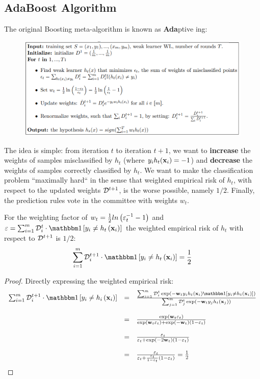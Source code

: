 \subsection{AdaBoost Algorithm}
The original Boosting meta-algorithm is known as \textbf{Ada}ptive ing:
\begin{figure}[h!]
	\centering
	\includegraphics[width=6in]{chapters/ensemble.methods/figures/adaboost_pseudo.png}
\end{figure}

The idea is simple: from iteration $t$ to iteration $t+1$, we want to \textbf{increase} the weights of samples misclassified  by $h_t$ (where $y_i h_t(\mathbf{x}_i)=-1$) and \textbf{decrease} the weights of samples correctly classified by $h_t$. We want to make the classification problem ``maximally hard`` in the sense that weighted empirical
risk of $h_t$, with respect to the updated weights $\mathcal{D}^{t+1}$, is the worse possible, namely $1/2$. Finally, the prediction rules vote in the committee with weights $w_t$.

\begin{claim}
For the weighting factor of $w_t=\frac{1}{2}ln\left(\varepsilon_t^{-1}-1\right)$ and $\varepsilon=\sum_{i=1}^m\Dc^t_i\cdot\indc{y_i\neq h_t\left(\x_i\right)}$ the weighted empirical risk of $h_t$ with respect to $\mathcal{D}^{t+1}$ is $1/2$: $$\sum_{i=1}^m\Dc_i^{t+1}\cdot\indc{y_i\neq h_t\left(\x_i\right)}=\frac{1}{2} $$
\end{claim}
\begin{proof}
	Directly expressing the weighted empirical risk:
$$
\begin{array}{ccl}
\sum_{i=1}^{m}\Dc_{i}^{t+1}\cdot\indc{y_{i}\neq h_{i}\left(\x_{i}\right)} & = & \frac{\sum_{i=1}^{m}\Dc_{i}^{t}\exp\left(-\w_{t}y_{i}h_{t}\left(\x_{i}\right)\indc{y_{i}\neq h_{t}\left(\x_{i}\right)}\right)}{\sum_{j=1}^{m}\Dc_{j}^{t}\exp\left(-\w_{t}y_{j}h_{t}\left(\x_{j}\right)\right)}\\
\\
& = & \frac{\exp\left(\w_{t}\eps_{t}\right)}{\exp\left(\w_{t}\eps_{t}\right)+\exp\left(-\w_{t}\right)\left(1-\eps_{t}\right)}\\
\\
& = & \frac{\eps_{t}}{\eps_{t}+\exp\left(-2\w_{t}\right)\left(1-\eps_{t}\right)}\\
\\
& = & \frac{\eps_{t}}{\eps_{t}+\frac{\eps_{t}}{1-\eps_{t}}\left(1-\eps_{t}\right)}=\frac{1}{2}
\end{array}
$$
\end{proof}

